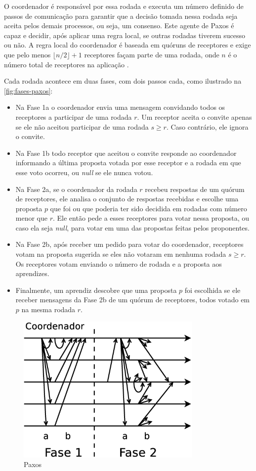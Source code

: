 O coordenador é responsável por essa rodada e executa um número definido de passos de
comunicação para garantir que a decisão tomada nessa rodada seja aceita pelos demais
processos, ou seja, um consenso. Este agente de Paxos é capaz e decidir, após aplicar uma
regra local, se outras rodadas tiverem sucesso ou não. A regra local do coordenador é
baseada em quóruns de receptores e exige que pelo menos $\lfloor n/2 \rfloor + 1$
receptores façam parte de uma rodada, onde $n$ é o número total de receptores na
aplicação \cite{lamport98}.

Cada rodada acontece em duas fases, com dois passos cada, como ilustrado na
\autoref{fig:fases-paxos}:

\begin{itemize}
  \item Na Fase 1a o coordenador envia uma mensagem convidando todos os receptores a
    participar de uma rodada $r$. Um receptor aceita o convite apenas se ele não aceitou
    participar de uma rodada $s \geq r$. Caso contrário, ele ignora o convite.
  \item Na Fase 1b todo receptor que aceitou o convite responde ao coordenador informando
    a última proposta votada por esse receptor e a rodada em que esse voto ocorreu, ou
    \textsl{null} se ele nunca votou.
  \item Na Fase 2a, se o coordenador da rodada $r$ recebeu respostas de um quórum de
    receptores, ele analisa o conjunto de respostas recebidas e escolhe uma proposta $p$
    que foi ou que poderia ter sido decidida em rodadas com número menor que $r$. Ele
    então pede a esses receptores para votar nessa proposta, ou caso ela seja
    \textsl{null}, para votar em uma das propostas feitas pelos proponentes.
  \item Na Fase 2b, após receber um pedido para votar do coordenador, receptores votam na
    proposta sugerida se eles não votaram em nenhuma rodada $s \geq r$. Os receptores
    votam enviando o número de rodada e a proposta aos aprendizes.
  \item Finalmente, um aprendiz descobre que uma proposta $p$ foi escolhida se ele receber
    mensagens da Fase 2b de um quórum de receptores, todos votado em $p$ na mesma rodada
    $r$.
\end{itemize}

\begin{figure}[htbp]
  \centering
  \includegraphics[width=9cm]{conteudo/capitulos/figuras/paxos.dia.eps}
  \caption{Paxos}
  \label{fig:fases-paxos}
\end{figure}

